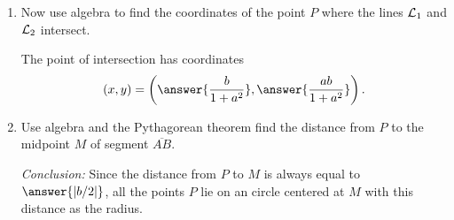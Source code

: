 \documentclass{ximera}
\begin{document}
\begin{question}
\begin{enumerate}
This line has equation
\[
   y = \answer{-\frac{1}{a}}\left( x - \answer{b} \right).
\]

\item Now use algebra to find the coordinates of the point $P$ where the lines ${\cal L}_1$ and ${\cal L}_2$ intersect.

The point of intersection has coordinates
\[
    (x,y) = \left(  \answer{\frac{b}{1+a^2}}  , \answer{\frac{ab}{1+a^2}}   \right) .
\]

\item Use algebra and the Pythagorean theorem find the distance from $P$ to the midpoint $M$ of segment $\overline{AB}$.

\emph{Conclusion:} Since the distance from $P$ to $M$ is always equal to $\answer{|b/2|}$, all the points $P$ lie on an circle centered at $M$ with this distance as the radius. 

\end{enumerate}


\end{question}
\end{document}
